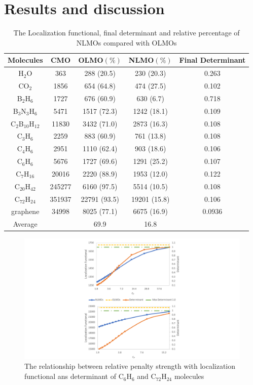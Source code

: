 \documentclass[aps,prl,reprint,amsmath,amssymb]{revtex4-1}
\begin{document}
\section{Results and discussion}
\begin{table}[ht]
\caption{The Localization functional, final determinant and relative percentage of NLMOs compared with OLMOs}
\centering
\begin{tabular}{c c c c c}
\hline\hline
Molecules & CMO &  OLMO$(\%)$ & NLMO$(\%)$ & Final Determinant \\
\hline
H$_2$O & 363 & 288 (20.5) & 230 (20.3) & 0.263 \\ 
CO$_2$ & 1856 & 654 (64.8) & 474 (27.5) & 0.102 \\
B$_2$H$_6$ & 1727 & 676 (60.9) & 630 (6.7) & 0.718 \\
B$_3$N$_3$H$_6$ & 5471 & 1517 (72.3)  & 1242 (18.1) & 0.109  \\
C$_2$B$_{10}$H$_{12}$ & 11830 & 3432 (71.0) & 2873 (16.3) & 0.108 \\ 
C$_3$H$_6$ & 2259 & 883 (60.9) & 761 (13.8) & 0.108 \\
C$_4$H$_6$ & 2951 & 1110 (62.4) & 903 (18.6) & 0.106 \\
C$_6$H$_6$  & 5676 & 1727 (69.6) & 1291 (25.2) & 0.107 \\ 
C$_7$H$_{16}$ & 20016 & 2220 (88.9) & 1953 (12.0) & 0.122 \\ 
C$_{20}$H$_{42}$ & 245277 & 6160 (97.5) & 5514 (10.5) & 0.108 \\ 
C$_{72}$H$_{24}$ & 351937 & 22791 (93.5) & 19201 (15.8) & 0.106 \\ 
graphene & 34998 & 8025 (77.1) & 6675 (16.9) & 0.0936 \\
Average & & 69.9 & 16.8 & \\
\hline
\end{tabular}
\label{table:nonlin}
\end{table}

\begin{figure}[htbp]
\includegraphics[scale=0.6]{figure_2.pdf} 
  \caption{The relationship between relative penalty strength with localization functional ans determinant of C$_6$H$_6$ and C$_{72}$H$_{24}$ molecules}
\end{figure}
\end{document}
